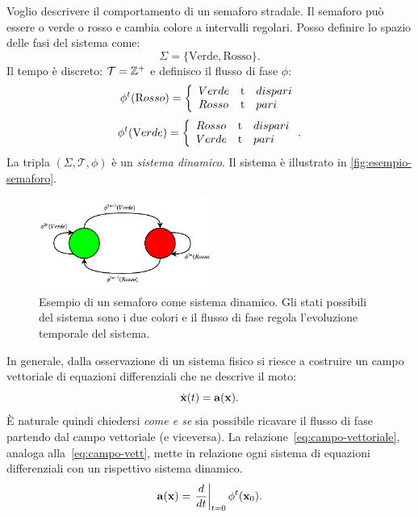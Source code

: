 \begin{example}
    \label{ex:semaforo}
    Voglio descrivere il comportamento di un semaforo stradale.
    Il semaforo può essere o verde o rosso e cambia colore a intervalli regolari.
    Posso definire lo spazio delle fasi del sistema come:
    \begin{equation*}
        \Sigma = \{\text{Verde}, \text{Rosso} \}.
    \end{equation*}
    Il tempo è discreto: $\mathcal T = \mathbb{Z}^+$ e definisco il flusso di fase $\phi$:
    \begin{equation*}
        \phi^t(\text Rosso) = \left\{
        \begin{array}{lrl}
            Verde &$t$ &dispari\\
            Rosso &$t$ &pari
        \end{array}
        \right.
    \end{equation*}
    \begin{equation*}
        \phi^t(\text Verde) = \left\{
        \begin{array}{lrl}
            Rosso &$t$ &dispari\\
            Verde &$t$ &pari
        \end{array}
        \right.
        .
    \end{equation*}
    La tripla $(\Sigma, \mathcal T, \phi)$ è un \emph{sistema dinamico}.
    Il sistema è illustrato in \autoref{fig:esempio-semaforo}.
    \begin{figure}[H]
        \centering
        \includegraphics[width=0.5\textwidth]{assets/ex-semaforo}
        \caption[Semaforo]{Esempio di un semaforo come sistema dinamico.
        Gli stati possibili del sistema sono i due colori e il flusso di fase
        regola l'evoluzione temporale del sistema.}
        \label{fig:esempio-semaforo}
    \end{figure}
\end{example}


In generale, dalla osservazione di un sistema fisico si riesce a costruire un campo vettoriale
di equazioni differenziali che ne descrive il moto:
\begin{equation}
    \dot {\mathbf{x}} (t) = \mathbf{a}(\mathbf{x}).
    \label{eq:campo-vett}
\end{equation}
È naturale quindi chiedersi \emph{come e se} sia possibile ricavare il flusso di fase partendo
dal campo vettoriale (e viceversa).
La relazione~\eqref{eq:campo-vettoriale},
analoga alla~\eqref{eq:campo-vett},
mette in relazione ogni sistema di equazioni differenziali con un rispettivo sistema dinamico.
\begin{equation}
    \mathbf{a} (\mathbf{x}) = \left.\frac d {dt} \right| _{t=0} \phi^t (\mathbf{x}_0).
    \label{eq:campo-vettoriale}
\end{equation}

